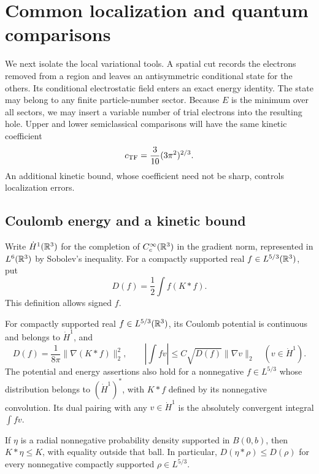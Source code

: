 \section{Common localization and quantum comparisons}
\label{sec:localization}

We next isolate the local variational tools.  A spatial cut records the
electrons removed from a region and leaves an antisymmetric conditional
state for the others.  Its conditional electrostatic field enters an
exact energy identity.  The state may belong to any finite particle-number sector. Because
$E$ is the minimum over all sectors,
we may insert a variable number of trial electrons into the resulting
hole.  Upper and lower semiclassical comparisons will have the same
kinetic coefficient
\[
 c_{\mathrm{TF}}=\frac3{10}(3\pi^2)^{2/3}.
\]
An additional kinetic bound, whose coefficient need not be sharp,
controls localization errors.

\subsection{Coulomb energy and a kinetic bound}

Write $\dot H^1(\mathbb R^3)$ for the completion of $C_c^\infty(\mathbb R^3)$ in
the gradient norm, represented in $L^6(\mathbb R^3)$ by Sobolev's inequality.
For a compactly supported real $f\in L^{5/3}(\mathbb R^3)$, put
\[
 D(f)=\frac12\int f(K*f).
\]
This definition allows signed $f$.

\begin{lemma}
\label{lem:loc-coulomb}
For compactly supported real $f\in L^{5/3}(\mathbb R^3)$, its Coulomb
potential is continuous and belongs to $\dot H^1$, and
\begin{equation}\label{eq:loc-coulomb-duality}
 D(f)=\frac1{8\pi}\|\nabla(K*f)\|_2^2,
 \qquad
 \left|\int fv\right|\leq C\sqrt{D(f)}\|\nabla v\|_2
 \quad(v\in\dot H^1).
\end{equation}
The potential and energy assertions also hold for a nonnegative
$f\in L^{5/3}$ whose distribution belongs to $(\dot H^1)^*$, with
$K*f$ defined by its nonnegative convolution.  Its dual pairing with
any $v\in\dot H^1$ is the absolutely convergent integral $\int fv$.

If $\eta$ is a radial nonnegative probability density supported in
$B(0,b)$, then $K*\eta\leq K$, with equality outside that ball.
In particular, $D(\eta*\rho)\leq D(\rho)$ for every nonnegative
compactly supported $\rho\in L^{5/3}$.
\end{lemma}


